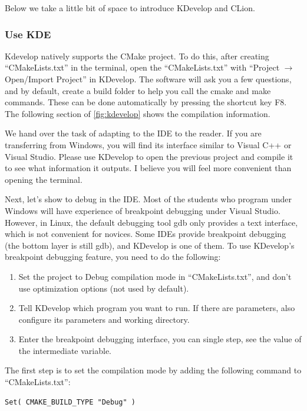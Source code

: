 Below we take a little bit of space to introduce KDevelop and CLion.

\subsubsection{Use KDE}
Kdevelop natively supports the CMake project. To do this, after creating ``CMakeLists.txt'' in the terminal, open the ``CMakeLists.txt'' with ``Project $\rightarrow$Open/Import Project'' in KDevelop. The software will ask you a few questions, and by default, create a build folder to help you call the cmake and make commands. These can be done automatically by pressing the shortcut key F8. The following section of \autoref{fig:kdevelop} shows the compilation information.

We hand over the task of adapting to the IDE to the reader. If you are transferring from Windows, you will find its interface similar to Visual C++ or Visual Studio. Please use KDevelop to open the previous project and compile it to see what information it outputs. I believe you will feel more convenient than opening the terminal.

Next, let's show to debug in the IDE. Most of the students who program under Windows will have experience of breakpoint debugging under Visual Studio. However, in Linux, the default debugging tool gdb only provides a text interface, which is not convenient for novices. Some IDEs provide breakpoint debugging (the bottom layer is still gdb), and KDevelop is one of them. To use KDevelop's breakpoint debugging feature, you need to do the following:

\begin{enumerate}
    \item Set the project to Debug compilation mode in ``CMakeLists.txt'', and don't use optimization options (not used by default).
    \item Tell KDevelop which program you want to run. If there are parameters, also configure its parameters and working directory.
    \item Enter the breakpoint debugging interface, you can single step, see the value of the intermediate variable.
\end{enumerate}


The first step is to set the compilation mode by adding the following command to ``CMakeLists.txt'':
\begin{lstlisting}[caption=slambook2/ch2/CMakeLists.txt]
Set( CMAKE_BUILD_TYPE "Debug" )
\end{lstlisting}

